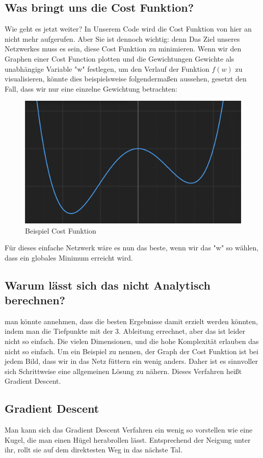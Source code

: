 \documentclass[12pt]{article}
\begin{document}
\subsection{Was bringt uns die Cost Funktion?}Wie geht es jetzt weiter? In Unserem Code wird die Cost Funktion von hier an nicht mehr aufgerufen. Aber Sie ist dennoch wichtig: denn Das Ziel unseres Netzwerkes muss es sein, diese Cost Funktion zu minimieren. Wenn wir den Graphen einer Cost Function plotten und die Gewichtungen Gewichte als unabhängige Variable "w" festlegen, um den Verlauf der Funktion $f(w)$ zu visualisieren, könnte dies beispielsweise folgendermaßen aussehen, gesetzt den Fall, dass wir nur eine einzelne Gewichtung betrachten:
\begin{figure}[H]
\centering
\includegraphics[scale=0.30]{./Images/Pasted image 20230914193809.png}
\caption{Beispiel Cost Funktion}
\label{Beispiel Cost Funktion}
\end{figure}Für dieses einfache Netzwerk wäre es nun das beste, wenn wir das "w" so wählen, dass ein globales Minimum erreicht wird. \subsection{Warum lässt sich das nicht Analytisch berechnen?}man könnte annehmen, dass die besten Ergebnisse damit erzielt werden könnten, indem man die Tiefpunkte mit der 3. Ableitung errechnet, aber das ist leider nicht so einfach.
Die vielen Dimensionen, und die hohe Komplexität erlauben das nicht so einfach. Um ein Beispiel zu nennen, der Graph der Cost Funktion ist bei jedem Bild, dass wir in das Netz füttern ein wenig anders. Daher ist es sinnvoller sich Schrittweise eine allgemeinen Lösung zu nähern. Dieses Verfahren heißt Gradient Descent. \subsection{Gradient Descent}Man kann sich das Gradient Descent Verfahren ein wenig so vorstellen wie eine Kugel, die man einen Hügel herabrollen lässt. Entsprechend der Neigung unter ihr, rollt sie auf dem direktesten Weg in das nächste Tal. 
\end{document}
